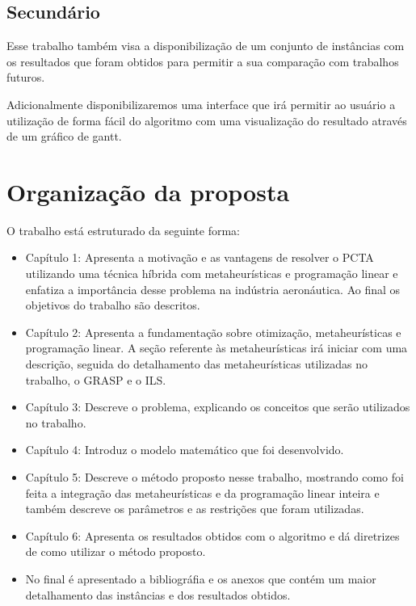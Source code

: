 \subsection{Secundário}

Esse trabalho também visa a disponibilização de um conjunto de instâncias com
os resultados que foram obtidos para permitir a sua comparação com trabalhos
futuros.

Adicionalmente disponibilizaremos uma interface que irá permitir ao usuário a
utilização de forma fácil do algoritmo com uma visualização do resultado através
de um gráfico de gantt.

\section {Organização da proposta }

O trabalho está estruturado da seguinte forma:

\begin{itemize}

\item Capítulo 1: Apresenta a motivação e as vantagens de resolver o PCTA
utilizando uma técnica híbrida com metaheurísticas e programação linear e
enfatiza a importância desse problema na indústria aeronáutica. Ao final os
objetivos do trabalho são descritos.

\item Capítulo 2: Apresenta a fundamentação sobre otimização, metaheurísticas
e programação linear. A seção referente às metaheurísticas irá
iniciar com uma descrição, seguida do detalhamento das metaheurísticas
utilizadas no trabalho, o GRASP e o ILS. 


\item Capítulo 3: Descreve o problema, explicando os conceitos que serão utilizados no trabalho.

\item Capítulo 4: Introduz o modelo matemático que foi desenvolvido.

\item Capítulo 5: Descreve o método proposto nesse trabalho, mostrando como foi
feita a integração das metaheurísticas e da programação linear inteira e também descreve os parâmetros e as restrições que foram utilizadas.

\item Capítulo 6: Apresenta os resultados obtidos com o algoritmo e dá
diretrizes de como utilizar o método proposto.

\item No final é apresentado a bibliográfia e os anexos que contém um maior
detalhamento das instâncias e dos resultados obtidos.

\end{itemize}